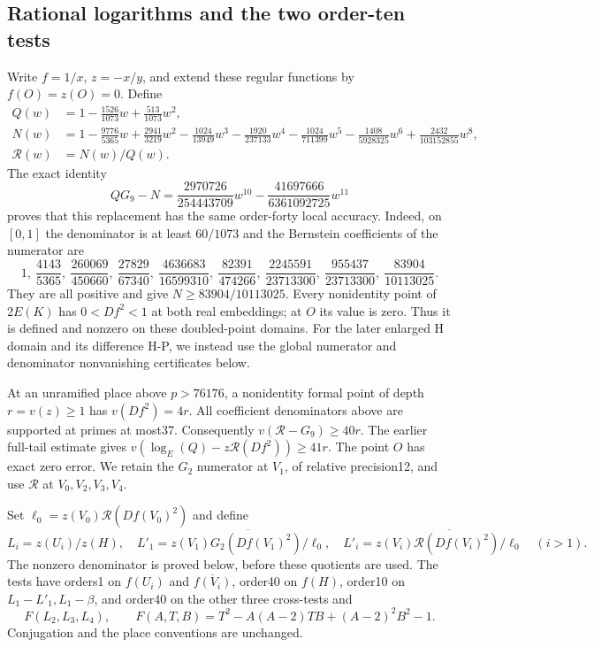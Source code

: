 \subsection{Rational logarithms and the two order-ten tests}
Write $f=1/x$, $z=-x/y$, and extend these regular functions by
$f(O)=z(O)=0$. Define
\begin{align*}
 Q(w)&=1-\frac{1526}{1073}w+\frac{513}{1073}w^2,\\
 N(w)&=1-\frac{9776}{5365}w+\frac{2941}{3219}w^2
 -\frac{1024}{13949}w^3-\frac{1920}{237133}w^4
 -\frac{1024}{711399}w^5-\frac{1408}{5928325}w^6
 +\frac{2432}{103152855}w^8,\\
 \mathcal R(w)&=N(w)/Q(w).
\end{align*}
The exact identity
\[
 QG_9-N=\frac{2970726}{254443709}w^{10}
       -\frac{41697666}{6361092725}w^{11}
\]
proves that this replacement has the same order-forty local accuracy.
Indeed, on $[0,1]$ the denominator is at least $60/1073$ and the
Bernstein coefficients of the numerator are
\[
 1,\ \frac{4143}{5365},\ \frac{260069}{450660},\
 \frac{27829}{67340},\ \frac{4636683}{16599310},\
 \frac{82391}{474266},\ \frac{2245591}{23713300},\
 \frac{955437}{23713300},\ \frac{83904}{10113025}.
\]
They are all positive and give $N\ge83904/10113025$. Every nonidentity point of $2E(K)$ has
$0<Df^2<1$ at both real embeddings; at $O$ its value is zero.
Thus it is defined and nonzero on these doubled-point domains. For
the later enlarged H domain and its difference H-P, we instead use
the global numerator and denominator nonvanishing certificates below.

At an unramified place above $p>76176$, a nonidentity formal point of
depth $r=v(z)\ge1$ has $v(Df^2)=4r$. All coefficient denominators
above are supported at primes at most37. Consequently
$v(\mathcal R-G_9)\ge40r$. The earlier full-tail estimate gives
$v(\log_E(Q)-z\mathcal R(Df^2))\ge41r$.
The point $O$ has exact zero error. We retain the $G_2$ numerator at
$V_1$, of relative precision12, and use $\mathcal R$ at $V_0,V_2,V_3,V_4$.

Set $\ell_0=z(V_0)\mathcal R(Df(V_0)^2)$ and define
\[
 L_i=z(U_i)/z(H),\quad
 L'_1=\overline{z(V_1)G_2(Df(V_1)^2)/\ell_0},\quad
 L'_i=\overline{z(V_i)\mathcal R(Df(V_i)^2)/\ell_0}\quad(i>1).
\]
The nonzero denominator is proved below, before these quotients are used.
The tests have orders1 on $f(U_i)$ and $\overline{f(V_i)}$, order40
on $f(H)$, order10 on $L_1-L'_1,L_1-\beta$, and order40 on the other
three cross-tests and
\[
 F(L_2,L_3,L_4),\qquad F(A,T,B)=T^2-A(A-2)TB+(A-2)^2B^2-1.
\]
Conjugation and the place conventions are unchanged.

